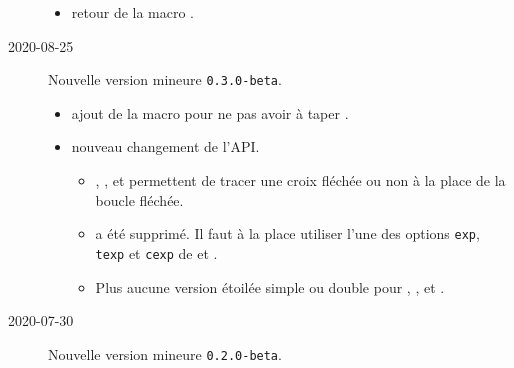 \documentclass[12pt,a4paper]{article}
\begin{document}
\begin{description}
    \begin{itemize}[itemsep=.5em]
        \item {}
              retour de la macro .
    
    
    \end{itemize}
    
    \separation
    


    \medskip
    \item[2020-08-25] Nouvelle version mineure \verb+0.3.0-beta+.
    
    \begin{itemize}[itemsep=.5em]
        \item {}
              ajout de la macro  pour ne pas avoir à taper .
    
    
        \item {} nouveau changement de l'API.
        \begin{itemize}[itemsep=.5em]
            \item {}, ,  et  permettent de tracer une croix fléchée ou non à la place de la boucle fléchée.
    
            \item {} a été supprimé. Il faut à la place utiliser l'une des options \verb#exp#, \verb#texp# et \verb#cexp# de  et .
    
            \item Plus aucune version étoilée simple ou double pour , ,  et .
        \end{itemize}
    
    
    \end{itemize}
    
    \separation
    


    \medskip
    \item[2020-07-30] Nouvelle version mineure \verb+0.2.0-beta+.
    

\end{description}
\end{document}
